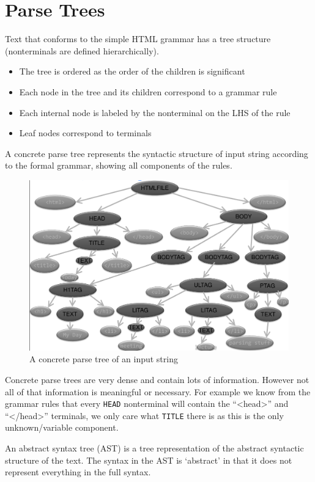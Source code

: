 \documentclass[
]{book}
\providecommand{\tightlist}{%
  \setlength{\itemsep}{0pt}\setlength{\parskip}{0pt}}
\begin{document}
\hypertarget{parse-trees}{%
\section{Parse Trees}\label{parse-trees}}

Text that conforms to the simple HTML grammar has a tree structure (nonterminals are defined hierarchically).

\begin{itemize}
\tightlist
\item
  The tree is ordered as the order of the children is significant
\item
  Each node in the tree and its children correspond to a grammar rule
\item
  Each internal node is labeled by the nonterminal on the LHS of the rule
\item
  Leaf nodes correspond to terminals
\end{itemize}

A {concrete parse tree} represents the syntactic structure of input string according to the formal grammar, showing all components of the rules.

\begin{figure}
\includegraphics[width=0.6\linewidth,height=0.6\textheight]{img/09-image03} \caption{A concrete parse tree of an input string}\label{fig:parse-tree}
\end{figure}

Concrete parse trees are very dense and contain lots of information. However not all of that information is meaningful or necessary. For example we know from the grammar rules that every \texttt{HEAD} nonterminal will contain the ``\textless head\textgreater{}'' and ``\textless/head\textgreater{}'' terminals, we only care what \texttt{TITLE} there is as this is the only unknown/variable component.

An {abstract syntax tree (AST)} is a tree representation of the abstract syntactic structure of the text. The syntax in the AST is `abstract' in that it does not represent everything in the full syntax.
\end{document}
